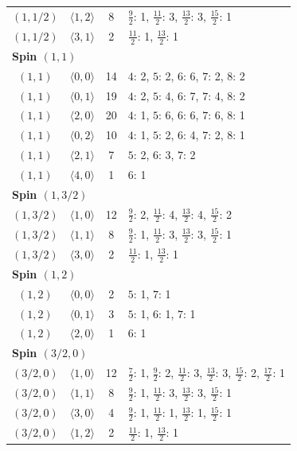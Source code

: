\begin{longtable}{c c c p{8.8cm}}
$(1,1/2)$ & $\langle 1,2\rangle$ & 8 & $\frac{9}{2}$: 1, $\frac{11}{2}$: 3, $\frac{13}{2}$: 3, $\frac{15}{2}$: 1 \\
$(1,1/2)$ & $\langle 3,1\rangle$ & 2 & $\frac{11}{2}$: 1, $\frac{13}{2}$: 1 \\
\midrule
\multicolumn{4}{l}{\textbf{Spin $(1,1)$}}\\
$(1,1)$ & $\langle 0,0\rangle$ & 14 & $4$: 2, $5$: 2, $6$: 6, $7$: 2, $8$: 2 \\
$(1,1)$ & $\langle 0,1\rangle$ & 19 & $4$: 2, $5$: 4, $6$: 7, $7$: 4, $8$: 2 \\
$(1,1)$ & $\langle 2,0\rangle$ & 20 & $4$: 1, $5$: 6, $6$: 6, $7$: 6, $8$: 1 \\
$(1,1)$ & $\langle 0,2\rangle$ & 10 & $4$: 1, $5$: 2, $6$: 4, $7$: 2, $8$: 1 \\
$(1,1)$ & $\langle 2,1\rangle$ & 7 & $5$: 2, $6$: 3, $7$: 2 \\
$(1,1)$ & $\langle 4,0\rangle$ & 1 & $6$: 1 \\
\midrule
\multicolumn{4}{l}{\textbf{Spin $(1,3/2)$}}\\
$(1,3/2)$ & $\langle 1,0\rangle$ & 12 & $\frac{9}{2}$: 2, $\frac{11}{2}$: 4, $\frac{13}{2}$: 4, $\frac{15}{2}$: 2 \\
$(1,3/2)$ & $\langle 1,1\rangle$ & 8 & $\frac{9}{2}$: 1, $\frac{11}{2}$: 3, $\frac{13}{2}$: 3, $\frac{15}{2}$: 1 \\
$(1,3/2)$ & $\langle 3,0\rangle$ & 2 & $\frac{11}{2}$: 1, $\frac{13}{2}$: 1 \\
\midrule
\multicolumn{4}{l}{\textbf{Spin $(1,2)$}}\\
$(1,2)$ & $\langle 0,0\rangle$ & 2 & $5$: 1, $7$: 1 \\
$(1,2)$ & $\langle 0,1\rangle$ & 3 & $5$: 1, $6$: 1, $7$: 1 \\
$(1,2)$ & $\langle 2,0\rangle$ & 1 & $6$: 1 \\
\midrule
\multicolumn{4}{l}{\textbf{Spin $(3/2,0)$}}\\
$(3/2,0)$ & $\langle 1,0\rangle$ & 12 & $\frac{7}{2}$: 1, $\frac{9}{2}$: 2, $\frac{11}{2}$: 3, $\frac{13}{2}$: 3, $\frac{15}{2}$: 2, $\frac{17}{2}$: 1 \\
$(3/2,0)$ & $\langle 1,1\rangle$ & 8 & $\frac{9}{2}$: 1, $\frac{11}{2}$: 3, $\frac{13}{2}$: 3, $\frac{15}{2}$: 1 \\
$(3/2,0)$ & $\langle 3,0\rangle$ & 4 & $\frac{9}{2}$: 1, $\frac{11}{2}$: 1, $\frac{13}{2}$: 1, $\frac{15}{2}$: 1 \\
$(3/2,0)$ & $\langle 1,2\rangle$ & 2 & $\frac{11}{2}$: 1, $\frac{13}{2}$: 1 \\

\end{longtable}
